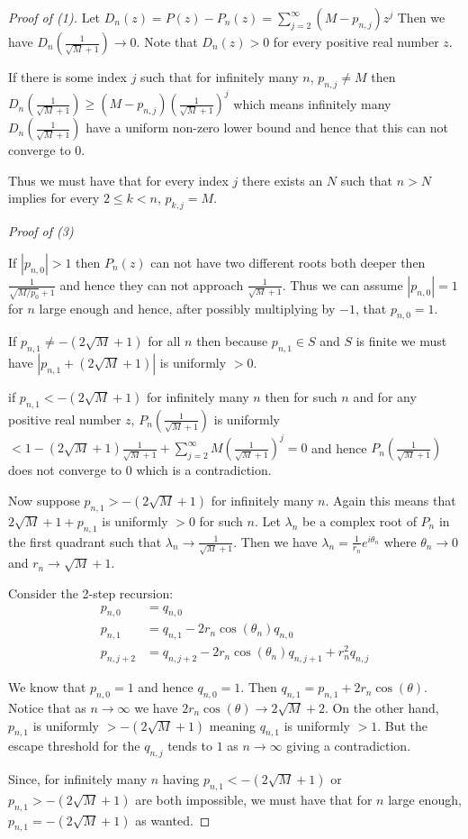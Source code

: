 \documentclass[10pt,a4paper]{amsart}
\begin{document}
\begin{proof}[Proof of (1)]
Let $D_n(z) = P(z) - P_n(z) = \sum_{j=2}^\infty (M-p_{n, j})z^j$ Then we have $D_n(\frac{1}{\sqrt{M}+1}) \rightarrow 0$. Note that $D_n(z) > 0$ for every positive real number $z$.

If there is some index $j$ such that for infinitely many $n$, $p_{n, j} \neq M$ then $D_n(\frac{1}{\sqrt{M}+1}) \geqslant (M-p_{n, j})(\frac{1}{\sqrt{M}+1})^j$ which means infinitely many $D_n(\frac{1}{\sqrt{M}+1})$ have a uniform non-zero lower bound and hence that this can not converge to $0$.

Thus we must have that for every index $j$ there exists an $N$ such that $n > N$ implies for every $2 \leqslant k < n$, $p_{k, j} = M$.


\bigskip
\noindent \textit{Proof of (3)}

If $|p_{n, 0}| > 1$ then $P_n(z)$ can not have two different roots both deeper then $\frac{1}{\sqrt{M/p_0}+1}$ and hence they can not approach $\frac{1}{\sqrt{M}+1}$. Thus we can assume $|p_{n, 0}| = 1$ for $n$ large enough and hence, after possibly multiplying by $-1$, that $p_{n, 0} = 1$.

If $p_{n, 1} \neq -(2\sqrt{M}+1)$ for all $n$ then because $p_{n, 1} \in S$ and $S$ is finite we must have $|p_{n, 1} + (2\sqrt{M}+1)|$ is uniformly $> 0$.

if $p_{n, 1} < -(2\sqrt{M}+1)$ for infinitely many $n$ then for such $n$ and for any positive real number $z$, $P_n(\frac{1}{\sqrt{M}+1})$ is uniformly $< 1 -(2\sqrt{M}+1)\frac{1}{\sqrt{M}+1} + \sum_{j=2}^\infty M(\frac{1}{\sqrt{M}+1})^j = 0$ and hence $P_n(\frac{1}{\sqrt{M}+1})$ does not converge to $0$ which is a contradiction.

Now suppose $p_{n, 1} > -(2\sqrt{M}+1)$ for infinitely many $n$. Again this means that $2\sqrt{M}+1 + p_{n, 1}$ is uniformly $> 0$ for such $n$. Let $\lambda_n$ be a complex root of $P_n$ in the first quadrant such that $\lambda_n \rightarrow \frac{1}{\sqrt{M}+1}$. Then we have $\lambda_n = \frac{1}{r_n}e^{i\theta_n}$ where $\theta_n \rightarrow 0$ and $r_n \rightarrow \sqrt{M}+1$.

Consider the 2-step recursion:
\begin{align*}
p_{n, 0} &= q_{n, 0}\\
p_{n, 1} &= q_{n, 1} - 2r_n\cos(\theta_n)q_{n, 0} \\
p_{n, j+2} &= q_{n, j+2} - 2r_n\cos(\theta_n)q_{n, j+1} + r^2_nq_{n, j}
\end{align*}

We know that $p_{n, 0} = 1$ and hence $q_{n, 0} = 1$. Then $q_{n, 1} = p_{n, 1} + 2r_n\cos(\theta)$. Notice that as $n \rightarrow \infty$ we have $2r_n\cos(\theta) \rightarrow 2\sqrt{M} + 2$. On the other hand, $p_{n, 1}$ is uniformly $> -(2\sqrt{M} + 1)$ meaning $q_{n, 1}$ is uniformly $> 1$. But the escape threshold for the $q_{n, j}$ tends to $1$ as $n \rightarrow \infty$ giving a contradiction.

Since, for infinitely many $n$ having $p_{n, 1} < -(2\sqrt{M}+1)$ or $p_{n, 1} > -(2\sqrt{M}+1)$ are both impossible, we must have that for $n$ large enough, $p_{n, 1} = -(2\sqrt{M}+1)$ as wanted.

\end{proof}
\end{document}
